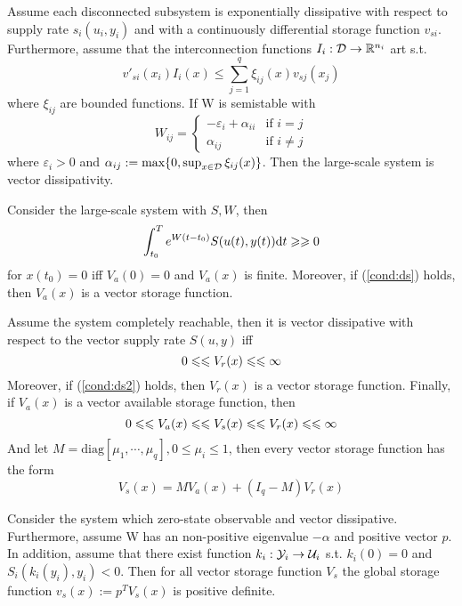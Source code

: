 \documentclass{paper}
\begin{document}
\begin{lem}
Assume each disconnected subsystem is exponentially dissipative with respect to supply rate $s_i(u_i,y_i)$ and with a continuously
differential storage function $v_{si}$. Furthermore, assume that the interconnection functions $I_i:\mathcal{D}\rightarrow \mathbb{R}^{n_i}$ art s.t.
\begin{equation}
v'_{si}(x_i)I_i(x)\leqslant \sum\limits_{j=1}^{q}\xi_{ij}(x)v_{sj}(x_j)
\end{equation}
where $\xi_{ij}$ are bounded functions. If W is semistable with
\begin{equation}
W_{ij}=
\begin{cases}
-\varepsilon_i+\alpha_{ii} & \text{if } i = j \\
\alpha_{ij} & \text{if } i \neq j
\end{cases}
\end{equation}
where $\varepsilon_i > 0$ and $\alpha_{ij}:=\text{max}\{0,\sup_{x\in\mathcal{D}}\xi_{ij}(x)\}$. Then the large-scale system is vector 
dissipativity.
\end{lem}
\begin{thm}
Consider the large-scale system with $S,W$, then
\begin{equation} \label{cond:ds}
\int_{t_0}^{T}e^{W(t-t_0)}S(u(t),y(t))\text{d} t\geqslant\geqslant 0
\end{equation}
for $x(t_0)=0$ iff $V_a(0)=0$ and $V_a(x)$ is finite. Moreover, if (\ref{cond:ds}) holds, then $V_a(x)$ is a vector storage function.
\end{thm}
\begin{thm}
Assume the system completely reachable, then it is vector dissipative with respect to the vector supply rate $S(u,y)$ iff
\begin{equation} \label{cond:ds2}
0\leqslant\leqslant V_r(x)\leqslant\leqslant\infty
\end{equation} 
Moreover, if (\ref{cond:ds2}) holds, then $V_r(x)$ is a vector storage function. Finally, if $V_a(x)$ is a vector available storage 
function, then
\begin{equation}
0\leqslant\leqslant V_a(x)\leqslant\leqslant V_s(x)\leqslant\leqslant V_r(x)\leqslant\leqslant \infty
\end{equation}
And let $M=\text{diag}[\mu_1,\cdots,\mu_q], 0\leqslant \mu_i \leqslant 1$, then every vector storage function has the form
\begin{equation}
V_s(x)=MV_a(x)+(I_q-M)V_r(x)
\end{equation} 
\end{thm}
\begin{thm}
Consider the system which zero-state observable and vector dissipative. Furthermore, assume W has an non-positive eigenvalue $-\alpha$ 
and positive vector $p$. In addition, assume that there exist function ${k_i}:{\mathcal{Y}_i}\rightarrow{\mathcal{U}_i}$ s.t. $k_i(0)=0$ and 
$S_i(k_i(y_i),y_i)<0$. Then for all vector storage function $V_s$ the global storage function $v_s(x):=p^TV_s(x)$ is positive definite.
\end{thm}
\end{document}
